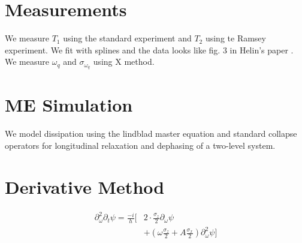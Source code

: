 \documentclass[
  amsfonts,
  amsmath,
  tbtags,
  amssymb,
  aps,
  nobibnotes,
  prl,
  twocolumn,
]{revtex4-2}
\begin{document}
\section{Measurements}
We measure $T_{1}$ using the standard experiment
and $T_{2}$ using te Ramsey experiment. We fit with splines
and the data looks like fig. 3 in Helin's paper \cite{zhang2020universal}.
We measure $\omega_{q}$ and $\sigma_{\omega_{q}}$ using X method.


\section{ME Simulation}
We model dissipation using the lindblad master
equation and standard collapse operators for
longitudinal relaxation and dephasing
of a two-level system.


\section{Derivative Method}
\begin{equation}
  \begin{aligned}
    \partial_{\omega}^{2} \partial_{t} \psi
    = \frac{-i}{h} [&2 \cdot \frac{\sigma_{z}}{2} \partial_{\omega} \psi\\
      &+ (\omega \frac{\sigma_{z}}{2} + A \frac{\sigma_{x}}{2}) \partial_{\omega}^{2} \psi]
  \end{aligned}
\end{equation}



\end{document}
